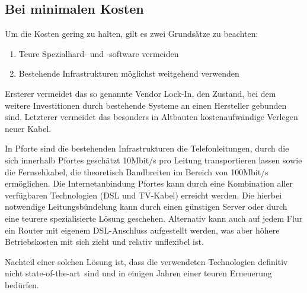 \documentclass[10pt,a4paper,notitlepage]{scrartcl}
\newcommand{\gfo}{\grqq\ }
\newcommand{\gfu}{\glqq}
\begin{document}
\subsection{Bei minimalen Kosten}
\begin{multicols}{2}
Um die Kosten gering zu halten, gilt es zwei Grundsätze zu beachten:
\begin{enumerate}
\item Teure Spezialhard- und -software vermeiden
\item Bestehende Infrastrukturen möglichst weitgehend verwenden
\end{enumerate}
Ersterer vermeidet das so genannte \gfu Vendor Lock-In\grqq, den Zustand, bei dem weitere Investitionen durch bestehende Systeme an einen Hersteller gebunden sind. Letzterer vermeidet das besonders in Altbauten kostenaufwändige Verlegen neuer Kabel.

In Pforte sind die bestehenden Infrastrukturen die Telefonleitungen, durch die sich innerhalb Pfortes geschätzt 10Mbit/s pro Leitung transportieren lassen sowie die Fernsehkabel, die theoretisch Bandbreiten im Bereich von 100Mbit/s ermöglichen. Die Internetanbindung Pfortes kann durch eine Kombination aller verfügbaren Technologien (DSL und TV-Kabel) erreicht werden. Die hierbei notwendige Leitungsbündelung kann durch einen günstigen Server oder durch eine teurere spezialisierte Lösung geschehen. Alternativ kann auch auf jedem Flur ein Router mit eigenem DSL-Anschluss aufgestellt werden, was aber höhere Betriebskosten mit sich zieht und relativ unflexibel ist.

Nachteil einer solchen Lösung ist, dass die verwendeten Technologien definitiv nicht \gfu state-of-the-art\gfo sind und in einigen Jahren einer teuren Erneuerung bedürfen.
\end{multicols}
\end{document}
